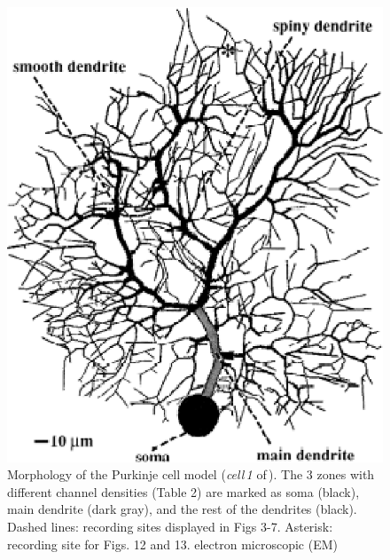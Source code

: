 \documentclass[12pt]{article}
\begin{document}
\begin{figure}[h]
\centering
   \includegraphics[scale=0.75]{figures/Fig.1.1.eps}
   \caption{Morphology of the Purkinje cell model ({\it cell\,1} of\,\cite{Rapp-P:1994qf}).  The 3 zones with different channel densities (Table 2) are marked
as soma (black), main dendrite (dark gray), and the rest of the dendrites
(black). Dashed lines: recording sites displayed in Figs 3-7. Asterisk: recording
site for Figs. 12 and 13.
electron microscopic (EM)}
   \label{fig:DS1.1}
\end{figure}

\clearpage
\end{document}
